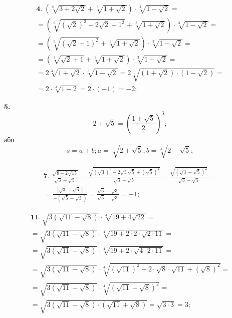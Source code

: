 \begin{multline*}
{\mathbf 4.}\;
\left(\sqrt[6]{3 + 2\sqrt{2}} + \sqrt[3]{1 + \sqrt{2}}\right) \cdot \sqrt[3]{1 - \sqrt{2}} =\\
= \left(\sqrt[6]{\left(\sqrt{2}\right)^2 + 2\sqrt{2} + 1^2} + \sqrt[3]{1 + \sqrt{2}}\right) \cdot \sqrt[3]{1 - \sqrt{2}} =\\
= \left(\sqrt[6]{\left(\sqrt{2} + 1\right)^2} + \sqrt[3]{1 + \sqrt{2}}\right) \cdot \sqrt[3]{1 - \sqrt{2}} =\\
= \left(\sqrt[3]{\sqrt{2} + 1} + \sqrt[3]{1 + \sqrt{2}}\right) \cdot \sqrt[3]{1 - \sqrt{2}} =\\
= 2\sqrt[3]{1 + \sqrt{2}} \cdot \sqrt[3]{1 - \sqrt{2}} =
2\sqrt[3]{\left(1 + \sqrt{2}\right) \cdot \left(1 - \sqrt{2}\right)} =\\
= 2 \cdot \sqrt[3]{1 - 2} = 2 \cdot (-1) = -2;
\end{multline*}

\textbf{5.}
$$
2 \pm \sqrt{5} = \left(\frac{1 \pm \sqrt{5}}{2}\right)^3;
$$
або
$$
s = a + b; a = \sqrt[3]{2 + \sqrt{5}}, b = \sqrt[3]{2 - \sqrt{5}};
$$

\begin{multline*}
{\mathbf 7.}\;
\frac{\sqrt{8 - 2\sqrt{15}}}{\sqrt{3} - \sqrt{5}} =
\frac{\sqrt{\left(\sqrt{3}\right)^2 - 2\sqrt{3}\sqrt{5} + \left(\sqrt{5}\right)^2}}{\sqrt{3} - \sqrt{5}} =
\frac{\sqrt{\left(\sqrt{3} - \sqrt{5}\right)^2}}{\sqrt{3} - \sqrt{5}} =\\
= \frac{\left|\sqrt{3} - \sqrt{5}\;\right|}{-\left(\sqrt{5} - \sqrt{3}\right)} =
\frac{\sqrt{5} - \sqrt{3}}{\sqrt{5} - \sqrt{3}} = -1;
\end{multline*}

\begin{multline*}
{\mathbf 11.}\;
\sqrt{3\left(\sqrt{11} - \sqrt{8}\right)} \cdot \sqrt[4]{19 + 4\sqrt{22}} =\\
= \sqrt{3\left(\sqrt{11} - \sqrt{8}\right)} \cdot \sqrt[4]{19 + 2 \cdot 2 \cdot \sqrt{2 \cdot 11}} =\\
= \sqrt{3\left(\sqrt{11} - \sqrt{8}\right)} \cdot \sqrt[4]{19 + 2 \cdot \sqrt{4 \cdot 2 \cdot 11}} =\\
= \sqrt{3\left(\sqrt{11} - \sqrt{8}\right)} \cdot \sqrt[4]{\left(\sqrt{11}\right)^2 + 2 \cdot \sqrt{8} \cdot \sqrt{11} + \left(\sqrt{8}\right)^2} =\\
= \sqrt{3\left(\sqrt{11} - \sqrt{8}\right)} \cdot \sqrt[4]{\left(\sqrt{11} + \sqrt{8}\right)^2} =\\
= \sqrt{3\left(\sqrt{11} - \sqrt{8}\right) \cdot \left(\sqrt{11} + \sqrt{8}\right)} =
\sqrt{3 \cdot 3} = 3;
\end{multline*}

